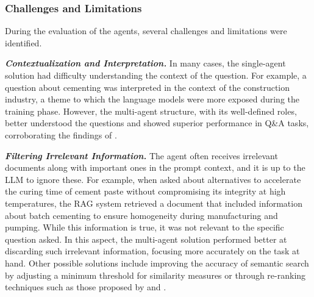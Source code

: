                 
            
            \subsubsection{Challenges and Limitations}     
                During the evaluation of the agents, several challenges and limitations were identified.

                \textbf{\textit{Contextualization and Interpretation.}} 
                    In many cases, the single-agent solution had difficulty understanding the context of the question. For example, a question about cementing was interpreted in the context of the construction industry, a theme to which the language models were more exposed during the training phase. 
                    However, the multi-agent structure, with its well-defined roles, better understood the questions and showed superior performance in Q\&A tasks, corroborating the findings of \citep{Li2024}.
                
                \textbf{\textit{Filtering Irrelevant Information.}} 
                    The agent often receives irrelevant documents along with important ones in the prompt context, and it is up to the LLM to ignore these. 
                    For example, when asked about alternatives to accelerate the curing time of cement paste without compromising its integrity at high temperatures, the RAG system retrieved a document that included information about batch cementing to ensure homogeneity during manufacturing and pumping. 
                    While this information is true, it was not relevant to the specific question asked. 
                    In this aspect, the multi-agent solution performed better at discarding such irrelevant information, focusing more accurately on the task at hand. 
                    Other possible solutions include improving the accuracy of semantic search by adjusting a minimum threshold for similarity measures or through re-ranking techniques such as those proposed by \citep{Carraro2024} and \citep{Sun2023}.
                
